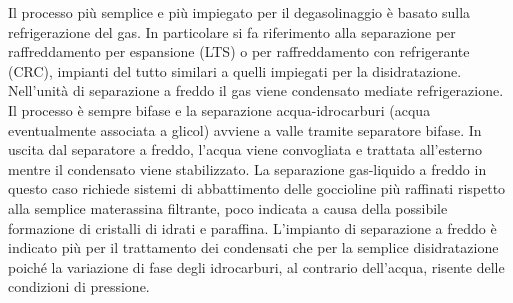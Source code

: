 Il processo più semplice e più impiegato per il degasolinaggio è basato sulla refrigerazione del gas. In particolare si fa riferimento alla separazione per raffreddamento per espansione (LTS) o per raffreddamento con refrigerante (CRC), impianti del tutto similari a quelli impiegati per la disidratazione.\\
Nell'unità di separazione a freddo il gas viene condensato mediate refrigerazione. Il processo è sempre bifase e la separazione acqua-idrocarburi (acqua eventualmente associata a glicol) avviene a valle tramite separatore bifase. In uscita dal separatore a freddo, l'acqua viene convogliata e trattata all'esterno mentre il condensato viene stabilizzato. La separazione gas-liquido a freddo in questo caso richiede sistemi di abbattimento delle goccioline più raffinati rispetto alla semplice materassina filtrante, poco indicata a causa della possibile formazione di cristalli di idrati e paraffina. L'impianto di separazione a freddo è indicato più per il trattamento dei condensati che per la semplice disidratazione poiché la variazione di fase degli idrocarburi, al contrario dell'acqua, risente delle condizioni di pressione.

